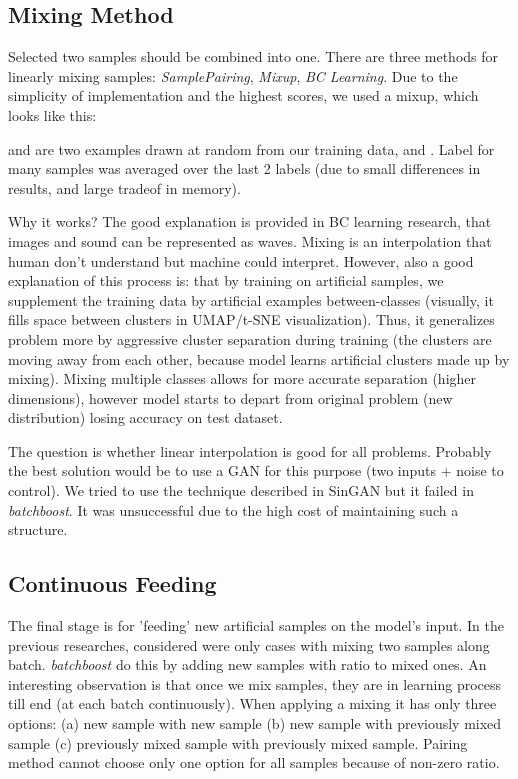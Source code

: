 \documentclass{article}
\begin{document}
\subsection{Mixing Method}
\label{sec:mixing}

Selected two samples should be combined into one.
There are three methods for linearly mixing samples: \emph{SamplePairing},
\emph{Mixup}, \emph{BC Learning}. Due to the simplicity of implementation and
the highest scores, we used a mixup, which looks like this:

 and  are two examples drawn at random from our
training data, and .
Label for many samples was averaged over the last 2 labels (due to small differences in results, and large tradeof in memory).

Why it works?
The good explanation is provided in BC learning research, that images and sound
can be represented as waves. Mixing is an interpolation that human don't
understand but machine could interpret.
However, also a good explanation of this process is: that by training on
artificial samples, we supplement the training data by artificial examples between-classes
(visually, it fills space between clusters in UMAP/t-SNE visualization).
Thus, it generalizes problem more by aggressive cluster separation during
training (the clusters are moving away from each other, because model learns
artificial clusters made up by mixing).
Mixing multiple classes allows for more accurate separation (higher dimensions), however model starts to depart from original problem (new distribution) losing accuracy on test dataset.

The question is whether linear interpolation is good for all problems.
Probably the best solution would be to use a GAN for this purpose (two inputs +
noise to control). We tried to use the technique described in
SinGAN\cite{shaham2019singan} but it
failed in \emph{batchboost}.  It was unsuccessful due to the high cost of
maintaining such a structure.

\subsection{Continuous Feeding}
\label{sec:feeding}

The final stage is for 'feeding' new artificial samples on the model's input. In
the previous researches, considered were only cases with mixing two samples along
batch. \emph{batchboost} do this by adding new samples with  ratio to
mixed ones.
An interesting observation is that once we mix samples, they are in learning
process till end (at each batch continuously).
When applying a mixing it has only three options: (a) new sample with new sample
(b) new sample with previously mixed sample (c) previously mixed sample with
previously mixed sample. Pairing method cannot choose only one option for all samples
because of non-zero  ratio.
\end{document}
